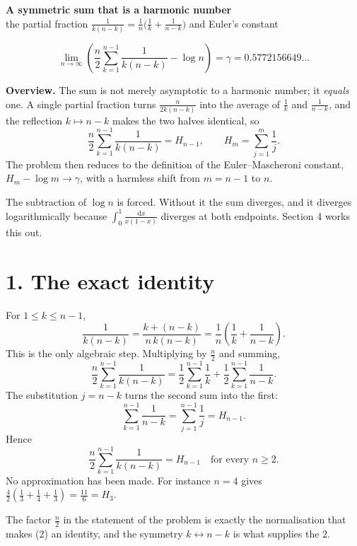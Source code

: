 \documentclass[12pt]{article}
\newcommand{\dd}{\,\mathrm{d}}
\newcommand{\Hh}{H}
\begin{document}
\begin{center}
{\Large\bfseries A symmetric sum that is a harmonic number}\\[0.35em]
{\large the partial fraction \(\tfrac1{k(n-k)}=\tfrac1n\bigl(\tfrac1k+\tfrac1{n-k}\bigr)\) and Euler's constant}
\end{center}

\[
\boxed{\displaystyle
\lim_{n\to\infty}
\left(\frac n2\sum_{k=1}^{n-1}\frac1{k(n-k)}-\log n\right)=\gamma
=0.5772156649\ldots}
\]

\textbf{Overview.}
The sum is not merely asymptotic to a harmonic number; it \emph{equals}
one. A single partial fraction turns \(\frac{n}{2k(n-k)}\) into the
average of \(\frac1k\) and \(\frac1{n-k}\), and the reflection
\(k\mapsto n-k\) makes the two halves identical, so
\[
\frac n2\sum_{k=1}^{n-1}\frac1{k(n-k)}=\Hh_{n-1},
\qquad \Hh_m=\sum_{j=1}^{m}\frac1j .
\]
The problem then reduces to the definition of the Euler--Mascheroni
constant, \(\Hh_m-\log m\to\gamma\), with a harmless shift from \(m=n-1\)
to \(n\).

The subtraction of \(\log n\) is forced. Without it the sum diverges, and
it diverges logarithmically because \(\int_0^1\frac{\dd x}{x(1-x)}\)
diverges at both endpoints. Section 4 works this out.

\section*{1. The exact identity}

For \(1\le k\le n-1\),
\[
\frac1{k(n-k)}
=\frac{k+(n-k)}{n\,k(n-k)}
=\frac1n\left(\frac1k+\frac1{n-k}\right).
\tag{1}
\]
This is the only algebraic step. Multiplying by \(\frac n2\) and summing,
\[
\frac n2\sum_{k=1}^{n-1}\frac1{k(n-k)}
=\frac12\sum_{k=1}^{n-1}\frac1k+\frac12\sum_{k=1}^{n-1}\frac1{n-k}.
\]
The substitution \(j=n-k\) turns the second sum into the first:
\[
\sum_{k=1}^{n-1}\frac1{n-k}=\sum_{j=1}^{n-1}\frac1j=\Hh_{n-1}.
\]
Hence
\[
\boxed{\displaystyle
\frac n2\sum_{k=1}^{n-1}\frac1{k(n-k)}=\Hh_{n-1}
\quad\text{for every }n\ge2 .}
\tag{2}
\]
No approximation has been made. For instance \(n=4\) gives
\(\frac42\left(\frac13+\frac14+\frac13\right)=\frac{11}{6}=\Hh_3\).

The factor \(\frac n2\) in the statement of the problem is exactly the
normalisation that makes (2) an identity, and the symmetry
\(k\leftrightarrow n-k\) is what supplies the \(2\).
\end{document}
